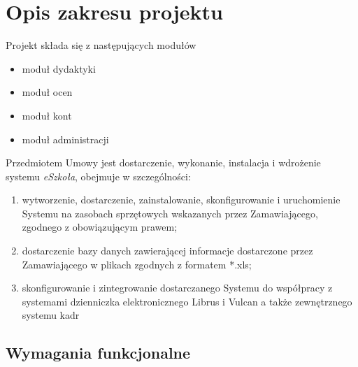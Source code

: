 \documentclass{article}
\begin{document}
\newpage
\section{Opis zakresu projektu}


Projekt składa się z następujących modułów
\begin{itemize}
    \item moduł dydaktyki
    \item moduł ocen
    \item moduł kont
    \item moduł administracji
\end{itemize}

Przedmiotem Umowy jest dostarczenie, wykonanie, instalacja i wdrożenie systemu \textit{eSzkoła}, obejmuje w szczególności:
\begin{enumerate}
    \item wytworzenie, dostarczenie, zainstalowanie, skonfigurowanie i uruchomienie Systemu na zasobach sprzętowych wskazanych przez Zamawiającego, zgodnego z obowiązującym prawem;
    \item dostarczenie bazy danych zawierającej informacje dostarczone przez Zamawiającego w plikach zgodnych z formatem *.xls;
    \item skonfigurowanie i zintegrowanie dostarczanego Systemu do współpracy z systemami dzienniczka elektronicznego Librus i Vulcan a także zewnętrznego systemu kadr
\end{enumerate}

\subsection{Wymagania funkcjonalne}
\end{document}
